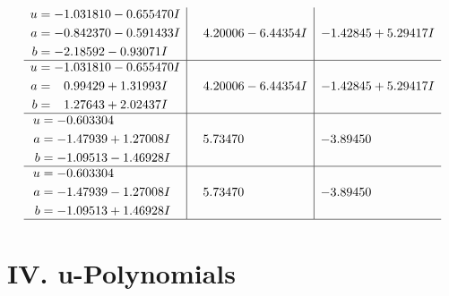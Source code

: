 \documentclass[1p]{elsarticle_modified}
\theoremstyle{definition}
\begin{document}
$$\begin{array}{c|c|c}
\begin{aligned}
u &= -1.031810 - 0.655470 I \\
a &= -0.842370 - 0.591433 I \\
b &= -2.18592 - 0.93071 I\end{aligned}
 & \phantom{-}4.20006 - 6.44354 I & -1.42845 + 5.29417 I \\ \hline\begin{aligned}
u &= -1.031810 - 0.655470 I \\
a &= \phantom{-}0.99429 + 1.31993 I \\
b &= \phantom{-}1.27643 + 2.02437 I\end{aligned}
 & \phantom{-}4.20006 - 6.44354 I & -1.42845 + 5.29417 I \\ \hline\begin{aligned}
u &= -0.603304\phantom{ +0.000000I} \\
a &= -1.47939 + 1.27008 I \\
b &= -1.09513 - 1.46928 I\end{aligned}
 & \phantom{-}5.73470\phantom{ +0.000000I} & -3.89450\phantom{ +0.000000I} \\ \hline\begin{aligned}
u &= -0.603304\phantom{ +0.000000I} \\
a &= -1.47939 - 1.27008 I \\
b &= -1.09513 + 1.46928 I\end{aligned}
 & \phantom{-}5.73470\phantom{ +0.000000I} & -3.89450\phantom{ +0.000000I}\\
 \hline 
 \end{array}$$\newpage
\newpage\renewcommand{\arraystretch}{1}
\centering \section*{ IV. u-Polynomials}
\end{document}

